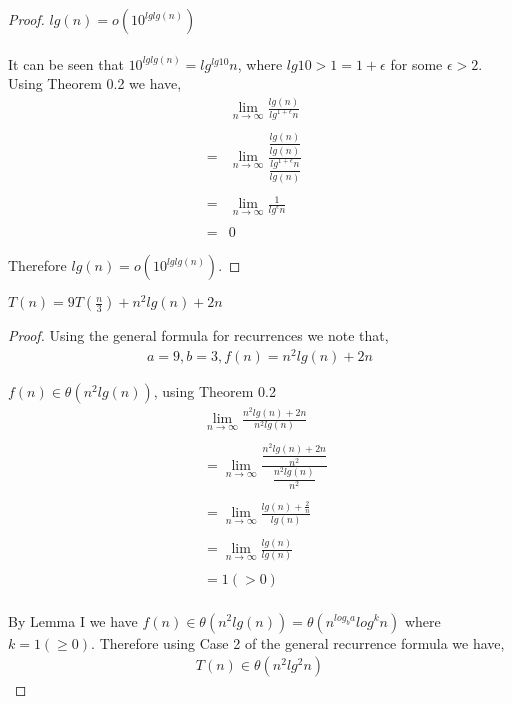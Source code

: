 \documentclass[12pt]{article}
\newenvironment{lemma}[2][Lemma]{\begin{trivlist}
\item[\hskip \labelsep {\bfseries #1}\hskip \labelsep {\bfseries #2.}]}{\end{trivlist}}
\newenvironment{question}[2][Question]{\begin{trivlist}
\item[\hskip \labelsep {\bfseries #1}\hskip \labelsep {\bfseries #2.}]}{\end{trivlist}}
\begin{document}
\begin{question}{4}
  \begin{proof} $lg(n) = o(10^{lglg(n)})$
    \leavevmode \\ \\
    It can be seen that $10^{lglg(n)} = lg^{lg10}n$, where $lg10 > 1 = 1 + \epsilon$ for some $\epsilon > 2$.
    Using Theorem 0.2 we have,
    \begin{align*}
      &\lim_{n\to\infty} \frac{
        lg(n)
      }{
        lg^{1 + \epsilon}n
      }&\\ \\
      = & \lim_{n\to\infty} \frac{
        \dfrac{lg(n)}{lg(n)}
      }{
        \dfrac{lg^{1 + \epsilon}n}{lg(n)}
      }&\\ \\
      = & \lim_{n\to\infty} \frac{
        1
      }{
        lg^{\epsilon}n
      }&\\ \\
      = & 0 &
    \end{align*}

    Therefore $lg(n) = o(10^{lglg(n)})$.
  \end{proof}
\end{question}

\begin{question}{5 (a)} $T(n) = 9T(\frac{n}{3}) + n^{2}lg(n) + 2n$
  \leavevmode \\
  \begin{proof}
  Using the general formula for recurrences we note that,
  \begin{align*}
    a = 9, b = 3, f(n) = n^{2}lg(n) + 2n
  \end{align*}

    \begin{lemma}{I} $f(n) \in \theta(n^{2}lg(n))$, using Theorem 0.2
      \begin{align*}
        &\lim_{n\to\infty} \frac{
        n^{2}lg(n) + 2n
      }{
        n^{2}lg(n)
      }\\ \\
      & = \lim_{n\to\infty} \frac{
        \dfrac{
          n^{2}lg(n) + 2n
        }{n^{2}}
      }{
        \dfrac{
          n^{2}lg(n)
        }{n^{2}}
      }\\ \\
      & = \lim_{n\to\infty} \frac{
        lg(n) + \frac{2}{n}
      }{
        lg(n)
      }\\ \\
      & = \lim_{n\to\infty} \frac{
        lg(n)
      }{
        lg(n)
      }\\ \\
      & = 1 (> 0)\\
      \end{align*}
    \end{lemma}

    By Lemma I we have $f(n) \in \theta(n^{2}lg(n)) = \theta(n^{log_{b}a}log^{k}n)$ where $k = 1 (\geq 0)$.
    Therefore using Case 2 of the general recurrence formula we have,
    \begin{align*}
      T(n) \in \theta(n^{2}lg^{2}n)
    \end{align*}
  \end{proof}
\end{question}
\end{document}
